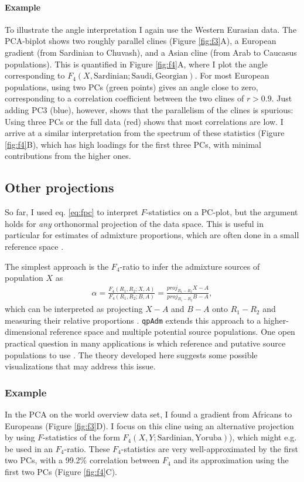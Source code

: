\documentclass[12pt,fullpage, a4paper]{article}
\newcommand{\vectorproj}[2][]{\textit{proj}_{#1}#2}
\begin{document}
\paragraph{Example}
To illustrate the angle interpretation I again use the Western Eurasian data. The PCA-biplot shows two roughly parallel clines (Figure \ref{fig:f3}A), a European gradient (from Sardinian to Chuvash), and a Asian cline (from Arab to Caucasus populations). This is quantified in Figure \ref{fig:f4}A, where I plot the angle corresponding to $F_4(X, \text{Sardinian}; \text{Saudi}, \text{Georgian})$. For most European populations, using two PCs (green points) gives an angle close to zero, corresponding to a correlation coefficient between the two clines of $r>0.9$. Just adding PC3 (blue), however, shows that the parallelism of the clines is spurious: Using three PCs or the full data (red) shows that most correlations are low. I arrive at a similar interpretation from the spectrum of these statistics (Figure \ref{fig:f4}B), which has high loadings for the first three PCs, with minimal contributions from the higher ones.

\subsection{Other projections}
So far, I used eq. \ref{eq:fpc} to interpret $F$-statistics on a PC-plot, but the argument holds for \emph{any} orthonormal projection of the data space. This is useful in particular for estimates of admixture proportions, which are often done in a small reference space \citep{patterson2012, petr2019, harney2021, oteo-garcia2021}. 

The simplest approach is the $F_4$-ratio to infer the admixture sources of population $X$ as 
\begin{eqnarray}
\alpha = \frac{F_4(R_1, R_2; X, A)}{F_4(R_1, R_2; B, A)} = \frac{\vectorproj[R_1 - R_2]{X - A}}{\vectorproj[R_1 - R_2]{B - A}} \label{eq:f4ratio},
\end{eqnarray}
which can be interpreted as projecting $X-A$ and $B-A$ onto $R_1 - R_2$ and measuring their relative proportions \citep{oteo-garcia2021}. \texttt{qpAdm} extends this approach to a higher-dimensional reference space and multiple potential source populations.  One open practical question in many applications is which reference and putative source populations to use \citep{harney2021}. The theory developed here suggests some possible visualizations that may address this issue. 


\subsubsection{Example}
In the PCA on the world overview data set, I found a gradient from Africans to Europeans (Figure \ref{fig:f3}D). I focus on this cline using an alternative projection by using  $F$-statistics of the form $F_4(X, Y; \text{Sardinian}, \text{Yoruba})$), which might e.g. be used in an $F_4$-ratio.  These $F_4$-statistics are very well-approximated by the first two PCs, with a 99.2\% correlation between $F_4$ and its approximation using the first two PCs (Figure \ref{fig:f4}C).
\end{document}
